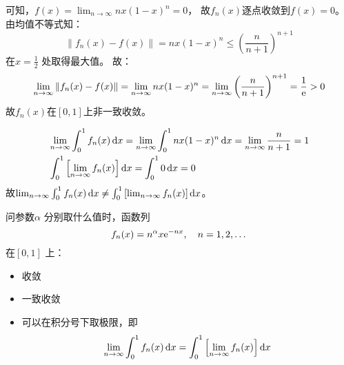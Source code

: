 \begin{solution}
    可知，\(f(x) = \lim_{n \to \infty} nx(1-x)^n = 0\)，
    故\(f_{n}(x)\)逐点收敛到\(f(x) = 0\)。
    由均值不等式知： \[
        \left\lVert f_{n}(x) - f(x) \right\rVert =
        nx(1-x)^{n} \le \left( \frac{n}{n + 1} \right)^{n+1}
    \]
    在\(x = \frac{1}{2}\) 处取得最大值。
    故： \[
        \lim_{n \to \infty} \left\lVert f_{n}(x) - f(x) \right\rVert
        = \lim_{n \to \infty} nx(1-x)^{n} = \lim_{n \to \infty}
        \left( \frac{n}{n + 1} \right)^{n+1} = \frac{1}{\mathrm{e}} > 0
    \]
    故\(f_{n}(x)\)在\([0,1]\)上非一致收敛。

    \begin{align*}
        & \lim_{n \to \infty} \int_0^1 f_n(x) \d{x}
        = \lim_{n \to \infty} \int_0^1 nx(1-x)^n \d{x}
        = \lim_{n \to \infty} \frac{n}{n+1} = 1
        \\
        & \int_0^1 \left[ \lim_{n \to \infty} f_n(x)
        \right] \d{x}
        = \int_0^1 0 \d{x} = 0
    \end{align*}
    故\(\lim_{n \to \infty} \int_0^1 f_n(x) \d{x} \neq \int_0^1
    \left[\lim_{n \to \infty} f_n(x) \right] \d{x}\)。
\end{solution}

\begin{problem}
    问参数\(\alpha\) 分别取什么值时，函数列
    \[
        f_n(x) = n^\alpha x\mathrm{e}^{-n x}, \quad n = 1, 2, \dots
    \] 在\([0,1]\) 上：
    \begin{itemize}
        \item 收敛
        \item 一致收敛
        \item 可以在积分号下取极限，即\[
                \lim_{n \to \infty} \int_0^1 f_n(x)
                \d{x} = \int_0^1
                \left[ \lim_{n \to \infty} f_n(x) \right] \d{x}
            \]
    \end{itemize}
\end{problem}

